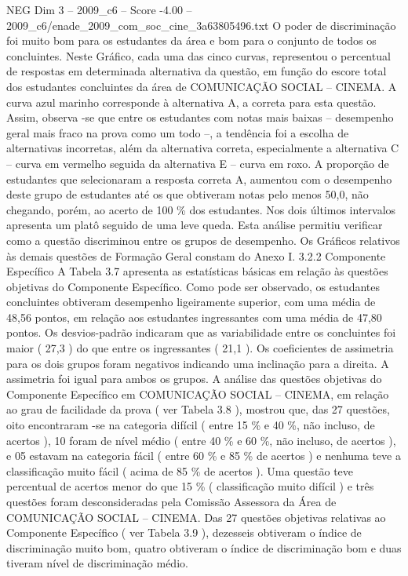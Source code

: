 \begin{textsample}{NEG Dim 3 – 2009\_c6 – Score -4.00 – 2009\_c6/enade\_2009\_com\_soc\_cine\_3a63805496.txt}
O poder de discriminação foi muito bom para os estudantes da área e bom para o conjunto de todos os concluintes.
Neste Gráfico, cada uma das cinco curvas, representou o percentual de respostas em determinada alternativa da questão, em função do escore total dos estudantes concluintes da área de COMUNICAÇÃO SOCIAL – CINEMA.
A curva azul marinho corresponde à alternativa A, a correta para esta questão.
Assim, observa -se que entre os estudantes com notas mais baixas – desempenho geral mais fraco na prova como um todo –, a tendência foi a escolha de alternativas incorretas, além da alternativa correta, especialmente a alternativa C – curva em vermelho seguida da alternativa E – curva em roxo.
A proporção de estudantes que selecionaram a resposta correta A, aumentou com o desempenho deste grupo de estudantes até os que obtiveram notas pelo menos 50,0, não chegando, porém, ao acerto de 100 \% dos estudantes.
Nos dois últimos intervalos apresenta um platô seguido de uma leve queda.
Esta análise permitiu verificar como a questão discriminou entre os grupos de desempenho.
Os Gráficos relativos às demais questões de Formação Geral constam do Anexo I. 3.2.2 Componente Específico A Tabela 3.7 apresenta as estatísticas básicas em relação às questões objetivas do Componente Específico.
Como pode ser observado, os estudantes concluintes obtiveram desempenho ligeiramente superior, com uma média de 48,56 pontos, em relação aos estudantes ingressantes com uma média de 47,80 pontos.
Os desvios-padrão indicaram que as variabilidade entre os concluintes foi maior ( 27,3 ) do que entre os ingressantes ( 21,1 ).
Os coeficientes de assimetria para os dois grupos foram negativos indicando uma inclinação para a direita.
A assimetria foi igual para ambos os grupos.
A análise das questões objetivas do Componente Específico em COMUNICAÇÃO SOCIAL – CINEMA, em relação ao grau de facilidade da prova ( ver Tabela 3.8 ), mostrou que, das 27 questões, oito encontraram -se na categoria difícil ( entre 15 \% e 40 \%, não incluso, de acertos ), 10 foram de nível médio ( entre 40 \% e 60 \%, não incluso, de acertos ), e 05 estavam na categoria fácil ( entre 60 \% e 85 \% de acertos ) e nenhuma teve a classificação muito fácil ( acima de 85 \% de acertos ).
Uma questão teve percentual de acertos menor do que 15 \% ( classificação muito difícil ) e três questões foram desconsideradas pela Comissão Assessora da Área de COMUNICAÇÃO SOCIAL – CINEMA.
Das 27 questões objetivas relativas ao Componente Específico ( ver Tabela 3.9 ), dezesseis obtiveram o índice de discriminação muito bom, quatro obtiveram o índice de discriminação bom e duas tiveram nível de discriminação médio.

\end{textsample}
